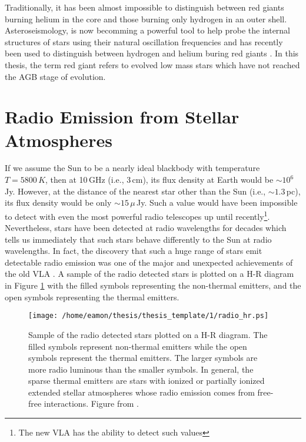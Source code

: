 Traditionally, it has been almost impossible to distinguish between red giants burning helium in the core and those burning only hydrogen in an outer shell. Asteroseismology, is now becomming a powerful tool to help probe the internal structures of stars using their natural oscillation frequencies \citep{beck_2011} and has recently been used to distinguish between hydrogen and helium buring red giants \citep{bedding_2011}. In this thesis, the term red giant refers to evolved low mass stars which have not reached the AGB stage of evolution.

\section{Radio Emission from Stellar Atmospheres}\label{sec:1.6}
If we assume the Sun to be a nearly ideal blackbody with temperature $T=5800\,K$, then at 10\,GHz (i.e., 3\,cm), its flux density at Earth would be $\sim 10^{6}$\,Jy. However, at the distance of the nearest star other than the Sun (i.e., $\sim 1.3$\,pc), its flux density would be only $\sim 15\,\mu$\,Jy. Such a value would have been impossible to detect with even the most powerful radio telescopes up until recently\footnote{The new VLA has the ability to detect such values}. Nevertheless, stars have been detected at radio wavelengths for decades which tells us immediately that such stars behave differently to the Sun at radio wavelengths. In fact, the discovery that such a huge range of stars emit detectable radio emission was one of the major and unexpected achievements of the old VLA \citep{white_2000}. A sample of the radio detected stars is plotted on a H-R diagram in Figure \ref{fig:1.6.1} with the filled symbols representing the non-thermal emitters, and the open symbols representing the thermal emitters. 

\begin{figure}[ht!]
\centering 
          \texttt{[image: /home/eamon/thesis/thesis\_template/1/radio\_hr.ps]}
\caption[Radio H-R diagram]{Sample of the radio detected stars plotted on a H-R diagram. The filled symbols represent non-thermal emitters while the open symbols represent the thermal emitters. The larger symbols are more radio luminous than the smaller symbols. In general, the sparse thermal emitters are stars with ionized or partially ionized extended stellar atmospheres whose radio emission comes from free-free interactions. Figure from \cite{white_2000}.}
\label{fig:1.6.1}
\end{figure}

